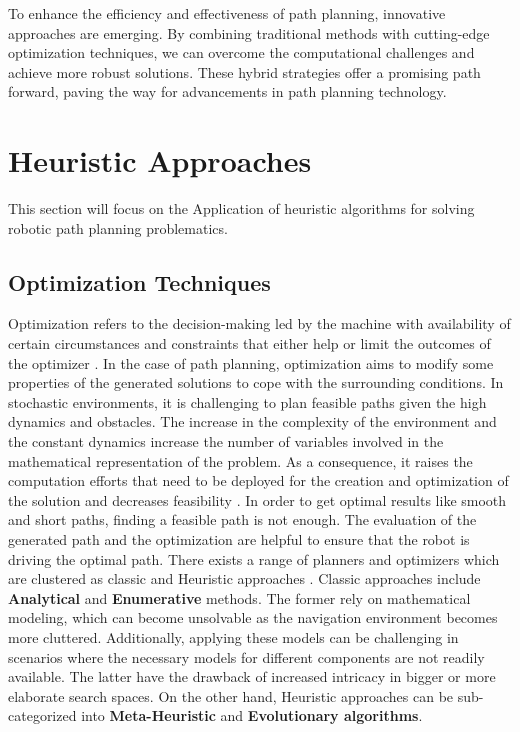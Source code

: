 To enhance the efficiency and effectiveness of path planning, innovative approaches are emerging. 
By combining traditional methods with cutting-edge optimization techniques, we can overcome the 
computational challenges and achieve more robust solutions. These hybrid strategies offer a 
promising path forward, paving the way for advancements in path planning technology.



\section{Heuristic Approaches}
This section will focus on the Application of heuristic algorithms for solving robotic path planning 
problematics. 

\subsection{Optimization Techniques}
Optimization refers to the decision-making led by the machine with availability of certain circumstances and constraints
that either help or limit the outcomes of the optimizer \cite{R37}. In the case of path planning, optimization aims
to modify some properties of the generated solutions to cope with the surrounding conditions.
In stochastic environments, it is challenging to plan feasible paths given the high dynamics 
and obstacles.
The increase in the complexity of the environment and the constant dynamics increase the number of variables involved 
in the mathematical representation of the problem. As a consequence, it raises the computation efforts that need to be 
deployed for the creation and optimization of the solution and decreases feasibility \cite{R7}.
In order to get optimal results like smooth and short paths, finding a feasible path is not enough. The evaluation 
of the generated path and the optimization are helpful to ensure that the robot is driving the optimal path.
There exists a range of planners and optimizers which are clustered as classic and Heuristic approaches \cite{R12}.
Classic approaches include \textbf{Analytical} and \textbf{Enumerative} methods. 
The former rely on mathematical modeling, which can become unsolvable as the navigation environment becomes more 
cluttered. Additionally, applying these models can be challenging in scenarios where the necessary models for different 
components are not readily available. The latter have the drawback of increased intricacy in bigger or more elaborate 
search spaces. On the other hand, Heuristic approaches can be sub-categorized into \textbf{Meta-Heuristic} and \textbf{Evolutionary algorithms}.
